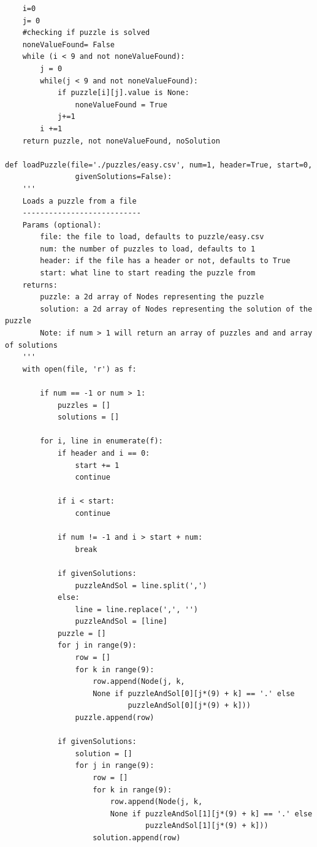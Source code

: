 \documentclass{article}
\begin{document}
\begin{verbatim}
    i=0 
    j= 0 
    #checking if puzzle is solved
    noneValueFound= False
    while (i < 9 and not noneValueFound):
        j = 0
        while(j < 9 and not noneValueFound):
            if puzzle[i][j].value is None: 
                noneValueFound = True
            j+=1
        i +=1 
    return puzzle, not noneValueFound, noSolution

def loadPuzzle(file='./puzzles/easy.csv', num=1, header=True, start=0, 
                givenSolutions=False):
    '''
    Loads a puzzle from a file
    ---------------------------
    Params (optional):
        file: the file to load, defaults to puzzle/easy.csv
        num: the number of puzzles to load, defaults to 1
        header: if the file has a header or not, defaults to True
        start: what line to start reading the puzzle from
    returns:
        puzzle: a 2d array of Nodes representing the puzzle
        solution: a 2d array of Nodes representing the solution of the puzzle
        Note: if num > 1 will return an array of puzzles and and array of solutions
    '''
    with open(file, 'r') as f:
        
        if num == -1 or num > 1:
            puzzles = []
            solutions = []

        for i, line in enumerate(f):
            if header and i == 0:
                start += 1
                continue

            if i < start:
                continue
        
            if num != -1 and i > start + num:
                break
            
            if givenSolutions:
                puzzleAndSol = line.split(',')
            else:
                line = line.replace(',', '')
                puzzleAndSol = [line]
            puzzle = []
            for j in range(9):
                row = []
                for k in range(9):
                    row.append(Node(j, k, 
                    None if puzzleAndSol[0][j*(9) + k] == '.' else 
                            puzzleAndSol[0][j*(9) + k]))
                puzzle.append(row)

            if givenSolutions:
                solution = []
                for j in range(9):
                    row = []
                    for k in range(9):
                        row.append(Node(j, k, 
                        None if puzzleAndSol[1][j*(9) + k] == '.' else 
                                puzzleAndSol[1][j*(9) + k]))
                    solution.append(row)


\end{verbatim}
\end{document}
